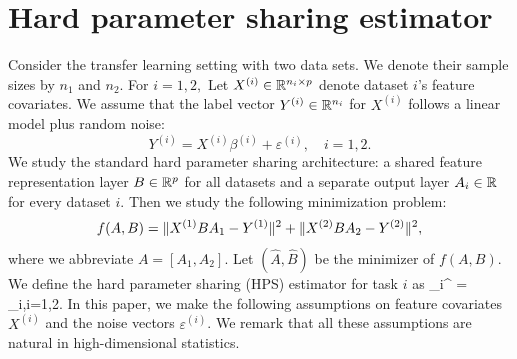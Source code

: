 \documentclass[aos,preprint]{imsart}
\begin{document}
\section{Hard parameter sharing estimator}\label{sec_HPS}

Consider the transfer learning setting with two data sets. We denote their sample sizes by $n_1$ and $n_2$. For $i=1,2,$ Let $X^{(i)} \in \mathbb{R}^{n_i \times p}$ denote dataset $i$'s feature covariates. We assume that the label vector $Y^{(i)} \in \mathbb{R}^{n_i}$ for $X^{(i)}$ follows a linear model plus random noise:
$$Y^{(i)}= X^{(i)}\beta^{(i)} + \varepsilon^{(i)},\quad i=1,2.$$
We study the standard hard parameter sharing architecture: a shared feature representation layer $B\in\mathbb{R}^{p}$ for all datasets and a separate output layer $A_i \in \mathbb{R}$ for every dataset $i$. Then we study the following minimization problem:
\begin{align}\label{eq_tsl}
			f(A, B) = \norm{X^{(1)} B A_1 - Y^{(1)}}^2 + \norm{X^{(2)} B A_2 - Y^{(2)}}^2,
\end{align}
where we abbreviate $A = [A_1, A_2]$. Let $(\hat{A}, \hat{B})$ be the minimizer of $f(A, B)$. We define the hard parameter sharing (HPS) estimator for task $i$ as 
\be\label{def_HPS}\hat{\beta}_i^{\MTL} =  _i,\quad i=1,2.\ee
In this paper, we make the following assumptions on feature covariates $X^{(i)}$ and the noise vectors $\varepsilon^{(i)}$. We remark that all these assumptions are natural in high-dimensional statistics. 
\end{document}
